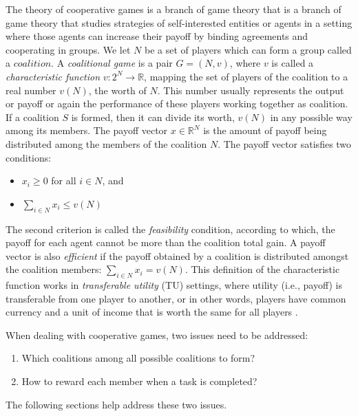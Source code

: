 
The theory of cooperative games is a branch of game theory that is a branch of game theory that studies
strategies of self-interested entities or agents in a setting
where those agents can increase their payoff by binding agreements
and cooperating in groups. We let $N$ be a set of players which
can form a group called a $coalition$. A \emph{coalitional game}
is a pair $G = (N, v)$, where $v$ is called a \emph{characteristic
function} $v: 2^N \to \mathbb{R}$, mapping the set of players of
the coalition to a real number $v(N)$, the worth of $N$. This
number usually represents the output or payoff or again the
performance of these players working together as coalition. If a
coalition $S$ is formed, then it can divide its worth, $v(N)$ in
any possible way among its members. The payoff vector $x \in
\mathbb{R}^N$ is the amount of payoff being distributed among the
members of the coalition $N$. The payoff vector satisfies two
conditions:

        \begin{itemize}
            \item $x_i \geq 0$ for all $i \in N$, and
            \item $\sum_{i \in N} x_i \leq v(N)$
        \end{itemize}

        The second criterion is called the \emph{feasibility} condition,
        according to which, the payoff for each agent cannot be more than
        the coalition total gain. A payoff vector is also \emph{efficient}
        if the payoff obtained by a coalition is distributed amongst the
        coalition members: $\sum_{i \in N} x_i = v(N)$. This definition of
        the characteristic function works in \emph{transferable utility}
        (TU) settings, where utility (i.e., payoff) is transferable from
        one player to another, or in other words, players have common
        currency and a unit of income that is worth the same for all players
        \cite{myerson1991game}.

        \noindent When dealing with cooperative games, two issues need to be
        addressed:
        \begin{enumerate}
            \item Which coalitions among all possible coalitions to form?
            \item How to reward each member when a task is completed?
        \end{enumerate}
        The following sections help address these two issues.

